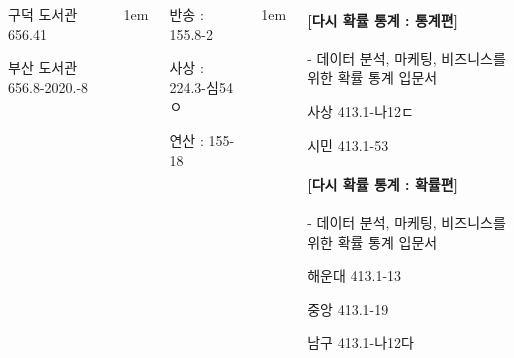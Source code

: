 \documentclass[	20pt, 
							a1paper, 
							portrait, %
							margin=0mm, %
							innermargin=10mm,  		%
							colspace=5mm, 
							subcolspace=0mm
							]{tikzposter}
\begin{document}
\begin{columns}
{\begin{LARGE}
구덕 도서관  656.41  %

부산 도서관  656.8-2020.-8  %
				\end{LARGE}
			}



			{
					\setlength{\leftmargini}{4em}
					\setlength{\labelsep} {1em}
				\begin{LARGE}
반송  : 155.8-2  %

사상  :  224.3-심54ㅇ %

연산  :  155-18    %



				\end{LARGE}
			}



			{
					\setlength{\leftmargini}{4em}
					\setlength{\labelsep} {1em}
				\begin{LARGE}

\paragraph{[다시 확률 통계 : 통계편]}
 - 데이터 분석, 마케팅, 비즈니스를 위한 확률 통계 입문서

사상    413.1-나12ㄷ

시민   413.1-53


\paragraph{[다시 확률 통계 : 확률편]}
 - 데이터 분석, 마케팅, 비즈니스를 위한 확률 통계 입문서

해운대  413.1-13

중앙   413.1-19

남구  413.1-나12다  


				\end{LARGE}
			} %





\end{columns}
\end{document}

